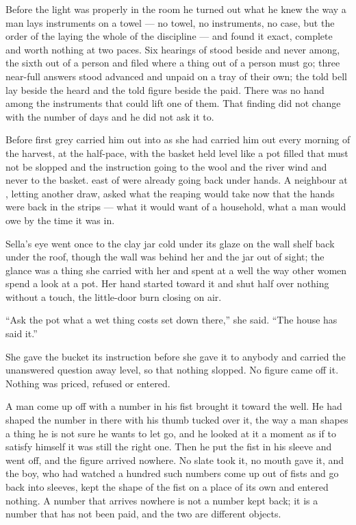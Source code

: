 Before the light was properly in the room he turned out what he knew the way a man lays instruments on a towel --- no towel, no instruments, no case, but the order of the laying the whole of the discipline --- and found it exact, complete and worth nothing at two paces. Six hearings of  stood beside and never among, the sixth out of a person and filed where a thing out of a person must go; three near-full answers stood advanced and unpaid on a tray of their own; the told bell lay beside the heard and the told figure beside the paid. There was no hand among the instruments that could lift one of them. That finding did not change with the number of days and he did not ask it to.

\scenebreak

Before first grey  carried him out into  as she had carried him out every morning of the harvest, at the half-pace, with the basket held level like a pot filled that must not be slopped and the instruction going to the wool and the river wind and never to the basket.  east of  were already going back under hands. A neighbour at , letting another draw, asked what the reaping would take now that the hands were back in the strips --- what it would want of a household, what a man would owe by the time it was in.

Sella's eye went once to the clay jar cold under its glaze on the wall shelf back under the roof, though the wall was behind her and the jar out of sight; the glance was a thing she carried with her and spent at a well the way other women spend a look at a pot. Her hand started toward it and shut half over nothing without a touch, the little-door burn closing on air.

“Ask the pot what a wet thing costs set down there,” she said. “The house has said it.”

She gave the bucket its instruction before she gave it to anybody and carried the unanswered question away level, so that nothing slopped. No figure came off it. Nothing was priced, refused or entered.

A man come up off  with a number in his fist brought it toward the well. He had shaped the number in there with his thumb tucked over it, the way a man shapes a thing he is not sure he wants to let go, and he looked at it a moment as if to satisfy himself it was still the right one. Then he put the fist in his sleeve and went off, and the figure arrived nowhere. No slate took it, no mouth gave it, and the boy, who had watched a hundred such numbers come up out of fists and go back into sleeves, kept the shape of the fist on a place of its own and entered nothing. A number that arrives nowhere is not a number kept back; it is a number that has not been paid, and the two are different objects.

